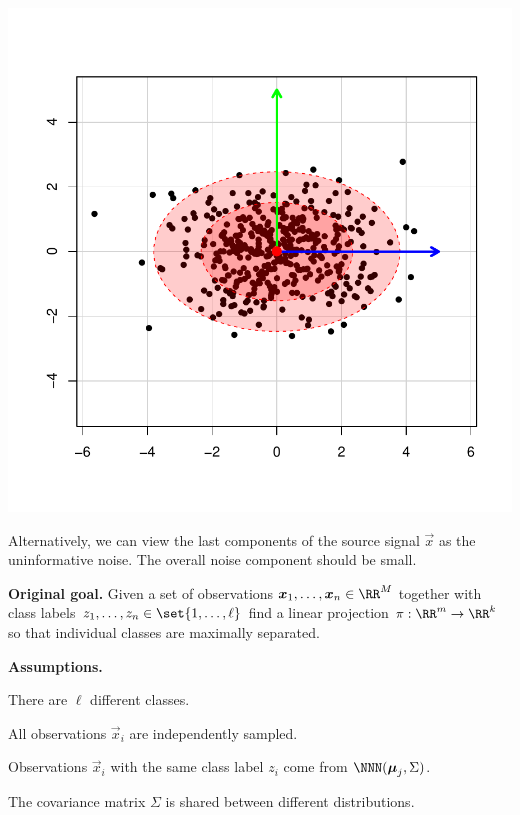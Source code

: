 \documentclass[landscape,footrule]{foils}
\newcommand{\lastline}{\vspace*{-2ex}}
\begin{document}
\begin{center}
\includegraphics[scale=0.45]{rotated-distribution-ii.pdf}
\end{center}\vspace*{-1cm}

Alternatively, we can view the last components of the source signal $\vec{x}$ as the uninformative noise. The overall noise component should be small.\lastline



\textbf{Original goal.}
Given a set of observations $\vec{x}_1,\ldots,\vec{x}_n\in\RR^M$ together with class labels $z_1,\ldots,z_n\in\set{1,\ldots,\ell}$ find a linear projection $\pi:\RR^m\to\RR^k$ so that individual classes are maximally separated.\vspace*{1cm}

\textbf{Assumptions.}
\begin{triangles}
\item There are $\ell$ different classes. 
\item All observations $\vec{x}_i$ are independently sampled.
\item Observations $\vec{x}_i$ with the same class label $z_i$ come from $\NNN(\vec{\mu}_j, \Sigma)$.
\item The covariance matrix $\Sigma$ is shared between different distributions.
\end{triangles}
\end{document}
